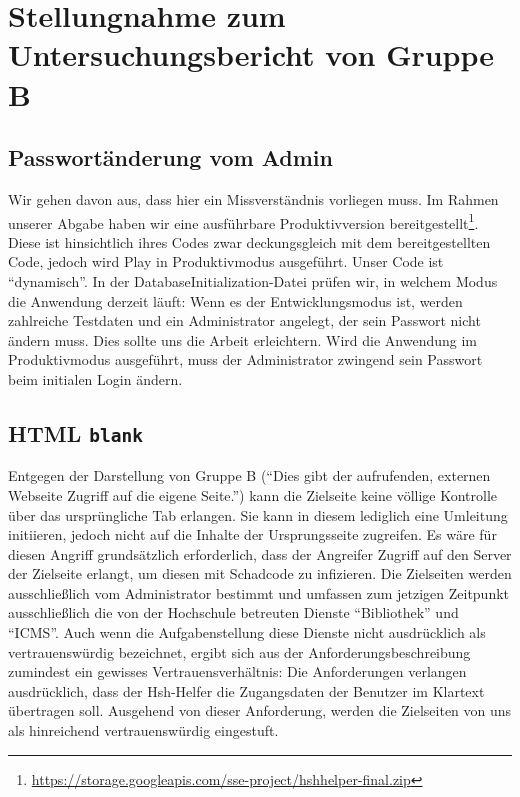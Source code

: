 \documentclass[12pt,DIV14,BCOR10mm,a4paper,parskip=half-,headsepline,headinclude,english,ngerman,bibliography=totocnumbered]{scrreprt}
\begin{document}
\vspace*{-3cm}

\tableofcontents  %

\chapter{Stellungnahme zum Untersuchungsbericht von Gruppe B}

\section{Passwortänderung vom Admin}
Wir gehen davon aus, dass hier ein Missverständnis vorliegen muss. Im Rahmen unserer Abgabe haben wir eine ausführbare Produktivversion bereitgestellt\footnote{\url{https://storage.googleapis.com/sse-project/hshhelper-final.zip}}. Diese ist hinsichtlich ihres Codes zwar deckungsgleich mit dem bereitgestellten Code, jedoch wird Play in Produktivmodus ausgeführt. Unser Code ist \enquote{dynamisch}. In der DatabaseInitialization-Datei prüfen wir, in welchem Modus die Anwendung derzeit läuft: Wenn es der Entwicklungsmodus ist, werden zahlreiche Testdaten und ein Administrator angelegt, der sein Passwort nicht ändern muss. Dies sollte uns die Arbeit erleichtern. Wird die Anwendung im Produktivmodus ausgeführt, muss der Administrator zwingend sein Passwort beim initialen Login ändern.

\section{HTML \texttt{blank}}

Entgegen der Darstellung von Gruppe B (\enquote{Dies gibt der aufrufenden, externen Webseite Zugriff auf die eigene Seite.}) kann die Zielseite keine völlige Kontrolle über das ursprüngliche Tab erlangen.
Sie kann in diesem lediglich eine Umleitung initiieren, jedoch nicht auf die Inhalte der Ursprungsseite zugreifen. Es wäre für diesen Angriff grundsätzlich erforderlich, dass der Angreifer Zugriff auf den Server der Zielseite erlangt, um diesen mit Schadcode zu infizieren. Die Zielseiten werden ausschließlich vom Administrator bestimmt und umfassen zum jetzigen Zeitpunkt ausschließlich die von der Hochschule betreuten Dienste \enquote{Bibliothek} und \enquote{ICMS}. Auch wenn die Aufgabenstellung diese Dienste nicht ausdrücklich als vertrauenswürdig bezeichnet, ergibt sich aus der Anforderungsbeschreibung zumindest ein gewisses Vertrauensverhältnis: Die Anforderungen verlangen ausdrücklich, dass der Hsh-Helfer die Zugangsdaten der Benutzer im Klartext übertragen soll. Ausgehend von dieser Anforderung, werden die Zielseiten von uns als hinreichend vertrauenswürdig eingestuft.
\end{document}
